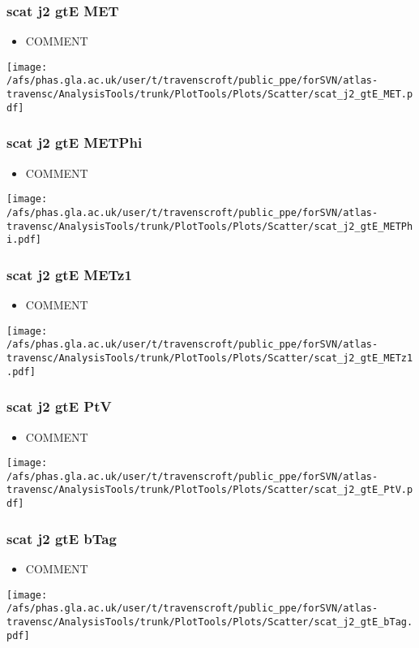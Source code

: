 \documentclass{beamer}
\begin{document}
\begin{frame}
\frametitle{scat j2 gtE MET}
\begin{itemize}
\item COMMENT
\end{itemize}
\begin{center}
\texttt{[image: /afs/phas.gla.ac.uk/user/t/travenscroft/public\_ppe/forSVN/atlas-travensc/AnalysisTools/trunk/PlotTools/Plots/Scatter/scat\_j2\_gtE\_MET.pdf]}
\end{center}
\end{frame}

\begin{frame}
\frametitle{scat j2 gtE METPhi}
\begin{itemize}
\item COMMENT
\end{itemize}
\begin{center}
\texttt{[image: /afs/phas.gla.ac.uk/user/t/travenscroft/public\_ppe/forSVN/atlas-travensc/AnalysisTools/trunk/PlotTools/Plots/Scatter/scat\_j2\_gtE\_METPhi.pdf]}
\end{center}
\end{frame}

\begin{frame}
\frametitle{scat j2 gtE METz1}
\begin{itemize}
\item COMMENT
\end{itemize}
\begin{center}
\texttt{[image: /afs/phas.gla.ac.uk/user/t/travenscroft/public\_ppe/forSVN/atlas-travensc/AnalysisTools/trunk/PlotTools/Plots/Scatter/scat\_j2\_gtE\_METz1.pdf]}
\end{center}
\end{frame}

\begin{frame}
\frametitle{scat j2 gtE PtV}
\begin{itemize}
\item COMMENT
\end{itemize}
\begin{center}
\texttt{[image: /afs/phas.gla.ac.uk/user/t/travenscroft/public\_ppe/forSVN/atlas-travensc/AnalysisTools/trunk/PlotTools/Plots/Scatter/scat\_j2\_gtE\_PtV.pdf]}
\end{center}
\end{frame}

\begin{frame}
\frametitle{scat j2 gtE bTag}
\begin{itemize}
\item COMMENT
\end{itemize}
\begin{center}
\texttt{[image: /afs/phas.gla.ac.uk/user/t/travenscroft/public\_ppe/forSVN/atlas-travensc/AnalysisTools/trunk/PlotTools/Plots/Scatter/scat\_j2\_gtE\_bTag.pdf]}
\end{center}
\end{frame}
\end{document}
